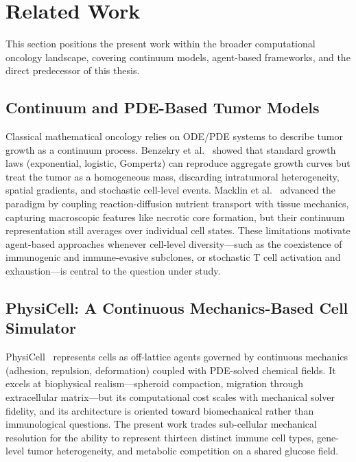 \section{Related Work}
\label{sec:related_work}

This section positions the present work within the broader computational oncology landscape, covering continuum models, agent-based frameworks, and the direct predecessor of this thesis.

\subsection{Continuum and PDE-Based Tumor Models}
\label{subsec:rw_continuum}

Classical mathematical oncology relies on ODE/PDE systems to describe tumor growth as a continuum process. Benzekry et al.~\cite{benzekry2014} showed that standard growth laws (exponential, logistic, Gompertz) can reproduce aggregate growth curves but treat the tumor as a homogeneous mass, discarding intratumoral heterogeneity, spatial gradients, and stochastic cell-level events. Macklin et al.~\cite{macklin2012} advanced the paradigm by coupling reaction-diffusion nutrient transport with tissue mechanics, capturing macroscopic features like necrotic core formation, but their continuum representation still averages over individual cell states. These limitations motivate agent-based approaches whenever cell-level diversity---such as the coexistence of immunogenic and immune-evasive subclones, or stochastic T cell activation and exhaustion---is central to the question under study.

\subsection{PhysiCell: A Continuous Mechanics-Based Cell Simulator}
\label{subsec:rw_physicell}

PhysiCell~\cite{ghaffarizadeh2018} represents cells as off-lattice agents governed by continuous mechanics (adhesion, repulsion, deformation) coupled with PDE-solved chemical fields. It excels at biophysical realism---spheroid compaction, migration through extracellular matrix---but its computational cost scales with mechanical solver fidelity, and its architecture is oriented toward biomechanical rather than immunological questions. The present work trades sub-cellular mechanical resolution for the ability to represent thirteen distinct immune cell types, gene-level tumor heterogeneity, and metabolic competition on a shared glucose field.

